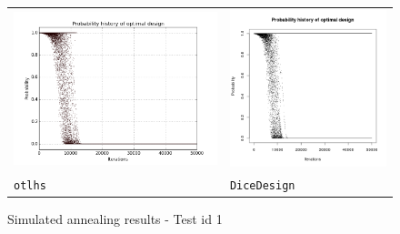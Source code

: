 \begin{figure}[!h]
\begin{center}
\begin{tabular}{>{\centering\arraybackslash}m{8cm}>{\centering\arraybackslash}m{8cm}}
 \includegraphics[scale=0.35]{lhs_c2_proba.png}   & \includegraphics[scale=0.35]{dice_c2_proba.png}\\
 \texttt{otlhs} & \texttt{DiceDesign}
\end{tabular}
\end{center}
\caption{Simulated annealing results - Test id 1}
\label{results_sa_test_id1}
\end{figure}

